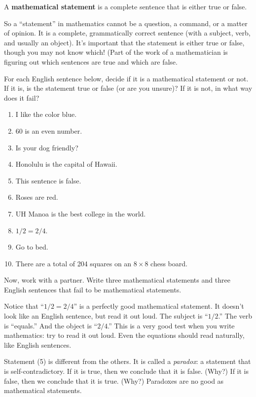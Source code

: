\begin{define}
A {\bf mathematical statement} is a complete sentence that is either true or false.
\end{define}

So a ``statement'' in mathematics cannot be a question, a command, or a matter of opinion.  It is a complete, grammatically correct sentence (with a subject, verb, and usually an object).  It's important that the statement is either true or false, though you may not know which!  (Part of the work of a mathematician is figuring out which sentences are true and which are false.

\begin{thinkpair*}
For each English sentence below, decide if it is a mathematical statement or not.  If it is, is the statement true or false (or are you unsure)?  If it is not, in what way does it fail?

\begin{enumerate}
\item
I like the color blue.
\item
$60$ is an even number.
\item
Is your dog friendly?
\item
Honolulu is the capital of Hawaii.
\item
This sentence is false.
\item
Roses are red.
\item
UH Manoa is the best college in the world.
\item
$1/2 = 2/4$.
\item
Go to bed.
\item
There are a total of 204 squares on an $8 \times 8$ chess board.
\end{enumerate}

Now, work with a partner.  Write three mathematical statements and three English sentences that fail to be mathematical statements.
\end{thinkpair*}

Notice that ``$1/2 = 2/4$'' is a perfectly good mathematical statement.  It doesn't look like an English sentence, but read it out loud.  The subject is ``$1/2$.'' The verb is ``equals.''  And the object is ``$2/4$.''  This is a very good test when you write mathematics: try to read it out loud.  Even the equations should read naturally, like English sentences. 

Statement (5) is different from the others.  It is called a \emph{paradox}: a statement that is self-contradictory.  If it is true, then we conclude that it is false.  (Why?)  If it is false, then we conclude that it is true.  (Why?)  Paradoxes are no good as mathematical statements.  

